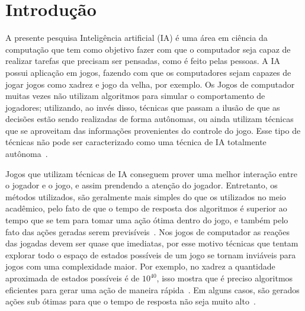 \chapter{\label{chap:intro}Introdução}

A presente pesquisa
Inteligência artificial (IA) é uma área em ciência da computação que tem como objetivo fazer com que o computador seja capaz de realizar tarefas que precisam ser pensadas, como é feito pelas pessoas.  
A IA possui aplicação em jogos, fazendo com que os computadores sejam capazes de jogar jogos como xadrez e jogo da velha, por exemplo. 
Os Jogos de computador muitas vezes não utilizam algoritmos para simular o comportamento de jogadores; utilizando, ao invés disso, técnicas que passam a ilusão de que as decisões estão sendo realizadas de forma autônomas, ou ainda utilizam técnicas que se aproveitam das informações provenientes do controle do jogo. Esse tipo de técnicas não pode ser caracterizado como uma técnica de IA totalmente autônoma~\cite{millington2009artificial}.

Jogos que utilizam técnicas de IA conseguem prover uma melhor interação entre o jogador e o jogo, e assim prendendo a atenção do jogador.
Entretanto, os métodos utilizados, são geralmente mais simples do que os utilizados no meio acadêmico, pelo fato de que o tempo de resposta dos algoritmos é superior ao tempo que se tem para tomar uma ação ótima dentro do jogo, e também pelo fato das ações geradas serem previsíveis~\cite{millington2009artificial}.
Nos jogos de computador as reações das jogadas devem ser quase que imediatas, por esse motivo técnicas que tentam explorar todo o espaço de estados possíveis de um jogo se tornam inviáveis para jogos com uma complexidade maior.
Por exemplo, no xadrez a quantidade aproximada de estados possíveis é de $10^{40}$, isso mostra que é preciso algoritmos eficientes para gerar uma ação de maneira rápida~\cite{millington2009artificial}. 
Em alguns casos, são gerados ações sub ótimas para que o tempo de resposta não seja muito alto~\cite[Capítulo 3]{intelligence2003modern}. 

